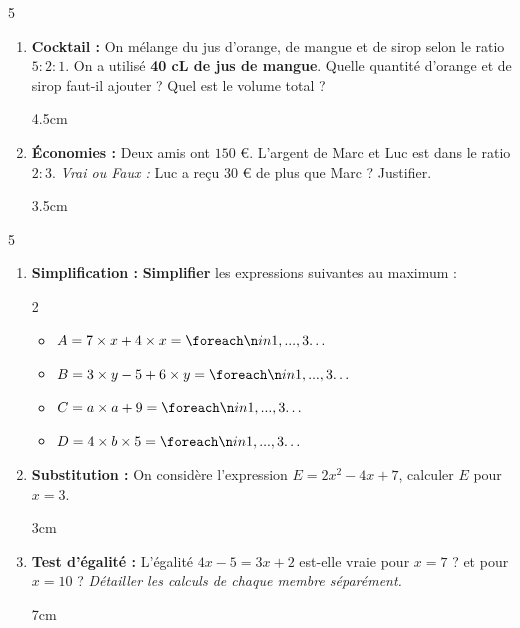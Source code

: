 \documentclass[a4paper]{book}
\begin{document}
{\begin{exerciceNote}{5}
\begin{enumerate}
            \item \textbf{Cocktail :} On mélange du jus d'orange, de mangue et de sirop selon le ratio $5:2:1$. 
            On a utilisé \textbf{40 cL de jus de mangue}. 
            Quelle quantité d'orange et de sirop faut-il ajouter ? Quel est le volume total ?
            \begin{ZoneReponse}{4.5cm}\end{ZoneReponse}
            
            \item \textbf{Économies :} Deux amis ont $150$ \euro. L'argent de Marc et Luc est dans le ratio $2:3$.
            \textit{Vrai ou Faux :} Luc a reçu $30$ \euro{} de plus que Marc ? Justifier.
            \begin{ZoneReponse}{3.5cm}\end{ZoneReponse}
        \end{enumerate}
    \end{exerciceNote}
    
    \begin{exerciceNote}{5} %
        \begin{enumerate}
            \item \textbf{Simplification :} \textbf{Simplifier} les expressions suivantes au maximum :
            \begin{multicols}{2}
                \begin{itemize}[label=\textbullet]
                    \item $A = 7 \times x + 4 \times x = \points[3]$
                    \item $B = 3 \times y - 5 + 6 \times y = \points[3]$
                    \item $C = a \times a + 9 = \points[3]$
                    \item $D = 4 \times b \times 5 = \points[3]$
                \end{itemize}
            \end{multicols}
        
            \item \textbf{Substitution :} On considère l'expression $E = 2x^2 - 4x + 7$, calculer $E$ pour $x = 3$.
            \begin{ZoneReponse}{3cm}\end{ZoneReponse}
    
    \newpage
    
            \item \textbf{Test d'égalité :} 
            L'égalité $4x - 5 = 3x + 2$ est-elle vraie pour $x = 7$ ? et pour $x = 10$ ?
            \textit{Détailler les calculs de chaque membre séparément.}
            \begin{ZoneReponse}{7cm}\end{ZoneReponse}
        \end{enumerate}
    \end{exerciceNote}
    
}
\end{document}
